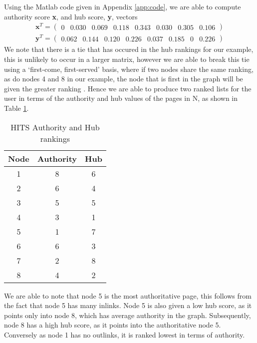 \documentclass[11pt]{report}
\begin{document}
Using the Matlab code given in Appendix \ref{app:code}, we are able to compute authority score \textbf{x}, and hub score, \textbf{y}, vectors
\begin{eqnarray*}
\textbf{x}^T = \left( \begin{array} {cccccccc}
0 & 0.030 & 0.069 & 0.118 & 0.343 &0.030 &0.305 &0.106
\end{array}\right) \\
\textbf{y}^T = \left( \begin{array} {cccccccc}
0.062 & 0.144 & 0.120 & 0.226 & 0.037 & 0.185 & 0 & 0.226
\end{array}\right)
\end{eqnarray*} We note that there is a tie that has occured in the hub rankings for our example, this is unlikely to occur in a larger matrix, however we are able to break this tie using a `first-come, first-served' basis, where if two nodes share the same ranking, as do nodes 4 and 8 in our example, the node that is first in the graph will be given the greater ranking \cite{langville}. Hence we are able to produce two ranked lists for the user in terms of the authority and hub values of the pages in N, as shown in Table \ref{tble:HITS}.

\begin{table}[h] \caption{HITS Authority and Hub rankings}
 \centering
 \begin{tabular} {c| c c} 
 Node & Authority & Hub \\ [0.5ex] 
 \hline
 1&8&6\\
 2&6&4\\
 3&5&5\\
 4&3&1\\
 5&1&7\\
 6&6&3\\
 7&2&8\\
 8&4&2\\
 \end{tabular}
 \label{tble:HITS}
\end{table} 

We are able to note that node 5 is the most authoritative page, this follows from the fact that node 5 has many inlinks. Node 5 is also given a low hub score, as it points only into node 8, which has average authority in the graph. Subsequently, node 8 has a high hub score, as it points into the authoritative node 5. Conversely as node 1 has no outlinks, it is ranked lowest in terms of authority.
\end{document}
